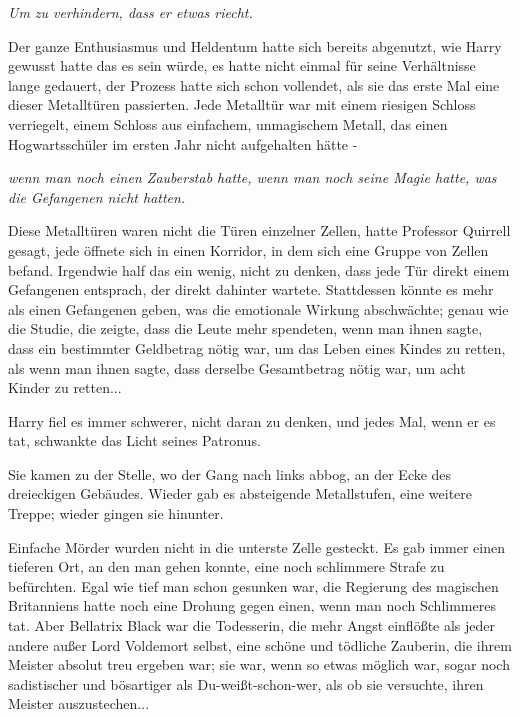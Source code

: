 \emph{Um zu verhindern, dass er etwas riecht.}

Der ganze Enthusiasmus und Heldentum hatte sich bereits abgenutzt, wie Harry
gewusst hatte das es sein würde, es hatte nicht einmal für seine Verhältnisse
lange gedauert, der Prozess hatte sich schon vollendet, als sie das erste Mal
eine dieser Metalltüren passierten. Jede Metalltür war mit einem riesigen
Schloss verriegelt, einem Schloss aus einfachem, unmagischem Metall, das einen
Hogwartsschüler im ersten Jahr nicht aufgehalten hätte -

\emph{wenn man noch einen Zauberstab hatte, wenn man noch seine Magie hatte,
was die Gefangenen nicht hatten.}

Diese Metalltüren waren nicht die Türen einzelner Zellen, hatte Professor
Quirrell gesagt, jede öffnete sich in einen Korridor, in dem sich eine Gruppe
von Zellen befand. Irgendwie half das ein wenig, nicht zu denken, dass jede Tür
direkt einem Gefangenen entsprach, der direkt dahinter wartete. Stattdessen
könnte es mehr als einen Gefangenen geben, was die emotionale Wirkung
abschwächte; genau wie die Studie, die zeigte, dass die Leute mehr spendeten,
wenn man ihnen sagte, dass ein bestimmter Geldbetrag nötig war, um das Leben
eines Kindes zu retten, als wenn man ihnen sagte, dass derselbe Gesamtbetrag
nötig war, um acht Kinder zu retten...

Harry fiel es immer schwerer, nicht daran zu denken, und jedes Mal, wenn er
es tat, schwankte das Licht seines Patronus.

Sie kamen zu der Stelle, wo der Gang nach links abbog, an der Ecke des
dreieckigen Gebäudes. Wieder gab es absteigende Metallstufen, eine weitere
Treppe; wieder gingen sie hinunter.

Einfache Mörder wurden nicht in die unterste Zelle gesteckt. Es gab immer einen
tieferen Ort, an den man gehen konnte, eine noch schlimmere Strafe zu
befürchten. Egal wie tief man schon gesunken war, die Regierung des magischen
Britanniens hatte noch eine Drohung gegen einen, wenn man noch Schlimmeres tat.
Aber Bellatrix Black war die Todesserin, die mehr Angst einflößte als jeder
andere außer Lord Voldemort selbst, eine schöne und tödliche Zauberin, die ihrem
Meister absolut treu ergeben war; sie war, wenn so etwas möglich war, sogar noch
sadistischer und bösartiger als Du-weißt-schon-wer, als ob sie versuchte, ihren
Meister auszustechen...

